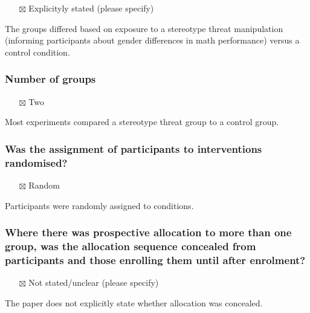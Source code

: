 \documentclass[
  doc, a4paper]{apa7}
\providecommand{\tightlist}{%
  \setlength{\itemsep}{0pt}\setlength{\parskip}{0pt}}
\begin{document}
\begin{itemize}
\tightlist
\item[$\boxtimes$]
  Explicityly stated (please specify)
\end{itemize}

The groups differed based on exposure to a stereotype threat manipulation (informing participants about gender differences in math performance) versus a control condition.

\subsubsection{Number of groups}\label{number-of-groups}

\begin{itemize}
\tightlist
\item[$\boxtimes$]
  Two
\end{itemize}

Most experiments compared a stereotype threat group to a control group.

\subsubsection{Was the assignment of participants to interventions randomised?}\label{was-the-assignment-of-participants-to-interventions-randomised}

\begin{itemize}
\tightlist
\item[$\boxtimes$]
  Random
\end{itemize}

Participants were randomly assigned to conditions.

\subsubsection{Where there was prospective allocation to more than one group, was the allocation sequence concealed from participants and those enrolling them until after enrolment?}\label{where-there-was-prospective-allocation-to-more-than-one-group-was-the-allocation-sequence-concealed-from-participants-and-those-enrolling-them-until-after-enrolment}

\begin{itemize}
\tightlist
\item[$\boxtimes$]
  Not stated/unclear (please specify)
\end{itemize}

The paper does not explicitly state whether allocation was concealed.
\end{document}
